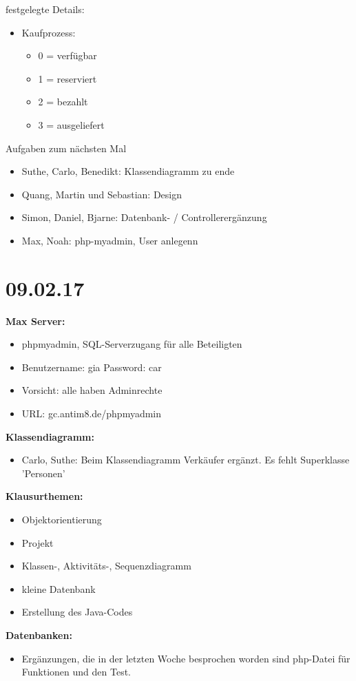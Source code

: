 \documentclass[11pt,a4paper]{scrbook}
\begin{document}
\newpage
\vspace*{1cm}
\Large{festgelegte Details:}
\normalsize
\begin{itemize}
\item Kaufprozess:
\begin{itemize}
\item 0 = verfügbar
\item 1 = reserviert
\item 2 = bezahlt
\item 3 = ausgeliefert
\end{itemize}

\end{itemize}

\vspace*{1cm}
\Large{Aufgaben zum nächsten Mal}
\normalsize
\begin{itemize}
\item Suthe, Carlo, Benedikt: Klassendiagramm zu ende
\item Quang, Martin und Sebastian: Design
\item Simon, Daniel, Bjarne: Datenbank- / Controllerergänzung
\item Max, Noah: php-myadmin, User anlegenn
\end{itemize}


\section*{09.02.17}
\textbf{Max Server:}
\begin{itemize}
\item phpmyadmin, SQL-Serverzugang für alle Beteiligten
\item Benutzername: gia  Password: car
\item Vorsicht: alle haben Adminrechte
\item URL: gc.antim8.de/phpmyadmin
\end{itemize}
\vspace{1cm}
\textbf{Klassendiagramm:} \\
\begin{itemize}
\item Carlo, Suthe: Beim Klassendiagramm Verkäufer ergänzt. Es fehlt Superklasse 'Personen'\\
\end{itemize}

\vspace{1cm}
\textbf{Klausurthemen:} 
\begin{itemize}
\item Objektorientierung
\item Projekt
\item Klassen-, Aktivitäts-, Sequenzdiagramm
\item kleine Datenbank
\item Erstellung des Java-Codes
\end{itemize}
\vspace{1cm}
\textbf{Datenbanken:} \\
\begin{itemize}
\item Ergänzungen, die in der letzten Woche besprochen worden sind
php-Datei für Funktionen und den Test.
\end{itemize}
\end{document}
